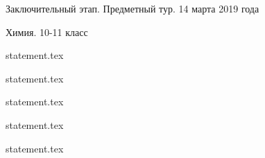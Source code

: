 \documentclass[a4paper,11pt, oneside]{book}
\begin{document}
\vspace{-3mm}
\vspace{-5mm}

\normalsize

\begin{center}
    Заключительный этап. Предметный тур. 14 марта 2019 года
    
    Химия. 10-11 класс
\end{center}

\parindent=0cm

{statement.tex}

{statement.tex}

{statement.tex}

{statement.tex}

{statement.tex}
\end{document}
